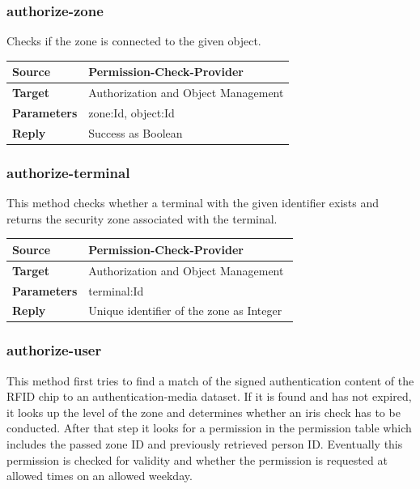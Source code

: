 \documentclass[12pt,a4paper,titlepage,oneside]{scrartcl}
\begin{document}
\subsubsection{authorize-zone}
Checks if the zone is connected to the given object.

\begin{table}[h]
    \centering
    \begin{tabular}{|l|p{12cm}|} \hline
    \textbf{Source}&Permission-Check-Provider\\ \hline
    \textbf{Target}&Authorization and Object Management\\ \hline
    \textbf{Parameters}&zone:Id, object:Id\\ \hline
    \textbf{Reply}&Success as Boolean\\ \hline
    \end{tabular}
\end{table}

\subsubsection{authorize-terminal}
This method checks whether a terminal with the given identifier exists and returns the security zone associated with the terminal.

\begin{table}[h]
    \centering
    \begin{tabular}{|l|p{12cm}|} \hline
    \textbf{Source}&Permission-Check-Provider\\ \hline
    \textbf{Target}&Authorization and Object Management\\ \hline
    \textbf{Parameters}&terminal:Id\\ \hline
    \textbf{Reply}&Unique identifier of the zone as Integer\ \hline
    \end{tabular}
\end{table}

\pagebreak

\subsubsection{authorize-user}
This method first tries to find a match of the signed authentication content of the RFID chip to an authentication-media dataset. If it is found and has not expired, it looks up the level of the zone and determines whether an iris check has to be conducted. After that step it looks for a permission in the permission table which includes the passed zone ID and previously retrieved person ID. Eventually this permission is checked for validity and whether the permission is requested at allowed times on an allowed weekday.
\end{document}
